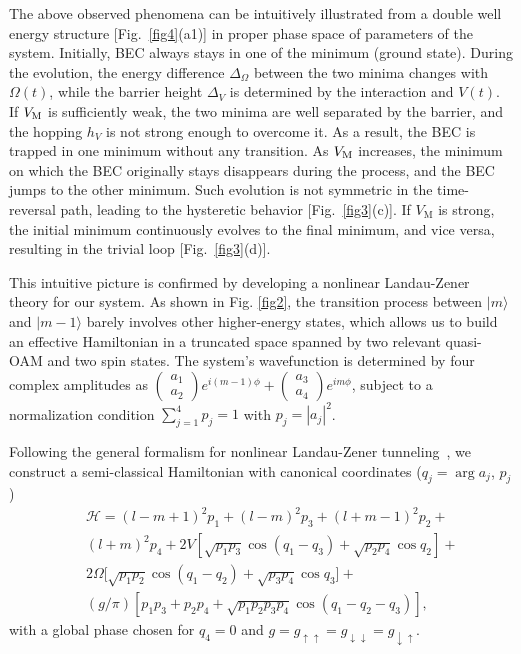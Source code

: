 \documentclass[twocolumn,prl,floatfix,citeautoscript,nofootinbib]{revtex4-1}
\begin{document}
The above observed phenomena can be intuitively illustrated from a double
well energy structure [Fig.~\ref{fig4}(a1)] in proper phase space of
parameters of the system. Initially, BEC always stays in one of the minimum
(ground state). During the evolution, the energy difference $\Delta _{\Omega
}$ between the two minima changes with $\Omega (t)$, while the barrier
height $\Delta _{V}$ is determined by the interaction and $V(t)$. If $V_{%
\mathrm{M}}$ is sufficiently weak, the two minima are well separated by the
barrier, and the hopping $h_{V}$ is not strong enough to overcome it. As a
result, the BEC is trapped in one minimum without any transition. As $V_{%
\mathrm{M}}$ increases, the minimum on which the BEC originally stays
disappears during the process, and the BEC jumps to the other minimum. Such
evolution is not symmetric in the time-reversal path, leading to the
hysteretic behavior [Fig.~\ref{fig3}(c)]. If $V_{\mathrm{M}}$ is strong, the
initial minimum continuously evolves to the final minimum, and vice versa,
resulting in the trivial loop [Fig.~\ref{fig3}(d)].

This intuitive picture is confirmed by developing a nonlinear Landau-Zener
theory for our system. As shown in Fig. \ref{fig2}, the transition process
between $|m\rangle $ and $|m-1\rangle $ barely involves other higher-energy
states, which allows us to build an effective Hamiltonian in a truncated
space spanned by two relevant quasi-OAM and two spin states. The system's
wavefunction is determined by four complex amplitudes as $\left(
\begin{array}{c}
a_{1} \\
a_{2}%
\end{array}%
\right) {{e^{i(m-1)\phi }+}}\left(
\begin{array}{c}
a_{3} \\
a_{4}%
\end{array}%
\right) {{e^{im\phi }}}$, subject to a normalization condition $%
\sum_{j=1}^{4}p_{j}=1$ with $p_{j}=|a_{j}|^{2}$.

Following the general formalism for nonlinear Landau-Zener tunneling~\cite%
{Liu2003,Wu2000}, we construct a semi-classical Hamiltonian with canonical
coordinates ($q_{j}=\arg a_{j}$, $p_{j}$)
\begin{eqnarray}
&&\mathcal{H}=(l-m+1)^{2}p_{1}+(l-m)^{2}p_{3}+(l+m-1)^{2}p_{2} +  \nonumber
\label{MiniH} \\
&&(l+m)^{2}p_{4}+2V[\sqrt{p_{1}p_{3}}\cos (q_{1}-q_{3})+\sqrt{p_{2}p_{4}}%
\cos q_{2}] +  \nonumber \\
&&2\Omega \lbrack \sqrt{p_{1}p_{2}}\cos (q_{1}-q_{2})+\sqrt{p_{3}p_{4}}\cos
q_{3}] +  \nonumber \\
&&(g/\pi )[p_{1}p_{3}+p_{2}p_{4}+\sqrt{p_{1}p_{2}p_{3}p_{4}}\cos
(q_{1}-q_{2}-q_{3})],
\end{eqnarray}%
with a global phase chosen for $q_{4}=0$ and $g=g_{\uparrow \uparrow
}=g_{\downarrow \downarrow }=g_{\downarrow \uparrow }$.
\end{document}
